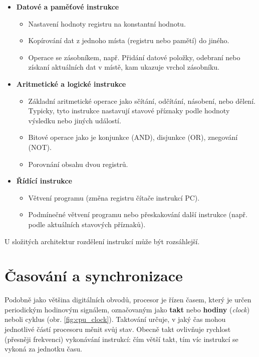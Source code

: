 \begin{itemize}
    \item \textbf{Datové a paměťové instrukce}
        \begin{itemize}
            \item Nastavení hodnoty registru na konstantní hodnotu.
            \item Kopírování dat z jednoho místa (registru nebo pamětí) do jiného.
            \item Operace se zásobníkem, např. Přidání datové položky, odebraní nebo získaní aktuálních
                dat v místě, kam ukazuje vrchol zásobníku.
        \end{itemize}
    \item \textbf{Aritmetické a logické instrukce}
        \begin{itemize}
            \item Základní aritmetické operace jako sčítání, odčítání, násobení, nebo dělení. Typicky,
                tyto instrukce nastavují stavové příznaky podle hodnoty výsledku nebo jiných událostí.
            \item Bitové operace jako je konjunkce (AND), disjunkce (OR), znegování (NOT).
            \item Porovnání obsahu dvou registrů.
        \end{itemize}
    \item \textbf{Řídící instrukce}
        \begin{itemize}
            \item Větvení programu (změna registru čítače instrukcí PC).
            \item Podmínečné větvení programu nebo přeskakování další instrukce (např. podle aktuálních
                stavových příznaků).
        \end{itemize}
\end{itemize}

U složitých architektur rozdělení instrukcí může být rozsáhlejší.

\section{Časování a synchronizace}

Podobně jako většina digitálních obvodů, procesor je řízen časem, který je určen periodickým
hodinovým signálem, označovaným jako \textbf{takt} nebo \textbf{hodiny} (\textit{clock}) neboli
cyklus (obr. \ref{fig:cpu_clock}). Taktování určuje, v jaký čas mohou jednotlivé částí procesoru
měnit svůj stav. Obecně takt ovlivňuje rychlost (přesněji frekvenci) vykonávání instrukcí: čím větší
takt, tím víc instrukcí se vykoná za jednotku času.

